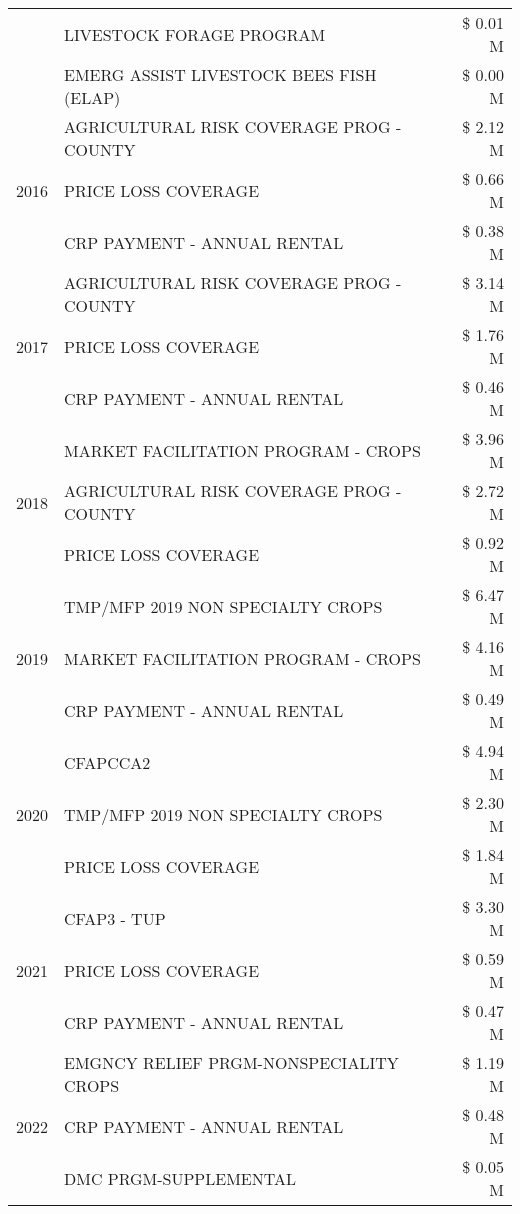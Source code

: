 \begin{tabular}{llr}
 & LIVESTOCK FORAGE PROGRAM & \$ 0.01 M \\
 & EMERG ASSIST LIVESTOCK BEES FISH (ELAP) & \$ 0.00 M \\
\cline{1-3}
\multirow[t]{3}{*}{2016} & AGRICULTURAL RISK COVERAGE PROG - COUNTY & \$ 2.12 M \\
 & PRICE LOSS COVERAGE & \$ 0.66 M \\
 & CRP PAYMENT - ANNUAL RENTAL & \$ 0.38 M \\
\cline{1-3}
\multirow[t]{3}{*}{2017} & AGRICULTURAL RISK COVERAGE PROG - COUNTY & \$ 3.14 M \\
 & PRICE LOSS COVERAGE & \$ 1.76 M \\
 & CRP PAYMENT - ANNUAL RENTAL & \$ 0.46 M \\
\cline{1-3}
\multirow[t]{3}{*}{2018} & MARKET FACILITATION PROGRAM - CROPS & \$ 3.96 M \\
 & AGRICULTURAL RISK COVERAGE PROG - COUNTY & \$ 2.72 M \\
 & PRICE LOSS COVERAGE & \$ 0.92 M \\
\cline{1-3}
\multirow[t]{3}{*}{2019} & TMP/MFP 2019 NON SPECIALTY CROPS & \$ 6.47 M \\
 & MARKET FACILITATION PROGRAM - CROPS & \$ 4.16 M \\
 & CRP PAYMENT - ANNUAL RENTAL & \$ 0.49 M \\
\cline{1-3}
\multirow[t]{3}{*}{2020} & CFAPCCA2 & \$ 4.94 M \\
 & TMP/MFP 2019 NON SPECIALTY CROPS & \$ 2.30 M \\
 & PRICE LOSS COVERAGE & \$ 1.84 M \\
\cline{1-3}
\multirow[t]{3}{*}{2021} & CFAP3 - TUP & \$ 3.30 M \\
 & PRICE LOSS COVERAGE & \$ 0.59 M \\
 & CRP PAYMENT - ANNUAL RENTAL & \$ 0.47 M \\
\cline{1-3}
\multirow[t]{3}{*}{2022} & EMGNCY RELIEF PRGM-NONSPECIALITY CROPS & \$ 1.19 M \\
 & CRP PAYMENT - ANNUAL RENTAL & \$ 0.48 M \\
 & DMC PRGM-SUPPLEMENTAL & \$ 0.05 M \\
\cline{1-3}
\bottomrule
\end{tabular}
